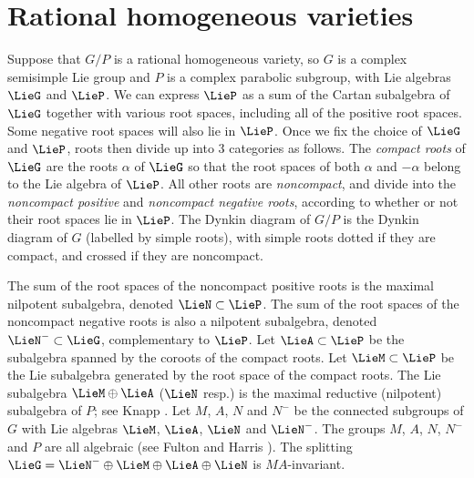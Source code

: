 \section{Rational homogeneous varieties}

Suppose that $G/P$ is a rational homogeneous variety,
so $G$ is a complex semisimple Lie group
and $P$ is a complex parabolic subgroup,
with Lie algebras $\LieG$ and $\LieP$. We can
express $\LieP$ as a sum
of the Cartan subalgebra of $\LieG$ together with
various root spaces, including all of the positive
root spaces. Some negative root spaces will also lie
in $\LieP$. Once we f\/ix the choice
of $\LieG$ and $\LieP$, roots then divide up into
3 categories as follows. The \emph{compact roots} of $\LieG$ are
the roots $\alpha$ of $\LieG$ so that the root spaces of
both $\alpha$ and $-\alpha$ belong to the Lie algebra
of $\LieP$.
All other roots are \emph{noncompact}, and divide
into the \emph{noncompact positive} and \emph{noncompact negative
roots}, according to whether or not their root spaces
lie in $\LieP$.
The Dynkin diagram of $G/P$ is the Dynkin
diagram of $G$ (labelled by simple roots),
with simple roots dotted if they are compact,
and crossed if they are noncompact.

The sum of the root spaces of the noncompact positive roots
is the maximal nilpotent subalgebra, denoted
$\LieN \subset \LieP$.
The sum of the root spaces of the noncompact negative roots
is also a nilpotent subalgebra, denoted
$\LieN^{-} \subset \LieG$, complementary to $\LieP$.
Let $\LieA \subset \LieP$
be the subalgebra spanned by the coroots of the compact roots.
Let $\LieM \subset \LieP$ be the Lie subalgebra generated
by the root space of the compact roots.
The Lie subalgebra
$\LieM \oplus \LieA$ ($\LieN$ resp.)
is the maximal reductive (nilpotent) subalgebra
of $P$; see Knapp \cite{Knapp:2002}.
Let $M$, $A$, $N$ and $N^-$ be the connected subgroups
of $G$ with Lie algebras
$\LieM$, $\LieA$, $\LieN$ and $\LieN^-$.
The groups $M$, $A$, $N$, $N^-$ and $P$
are all algebraic (see Fulton and Harris \cite[p.~382]{Fulton/Harris:1991}).
The splitting
$\LieG = \LieN^{-} \oplus \LieM \oplus \LieA \oplus \LieN$
is $MA$-invariant.

